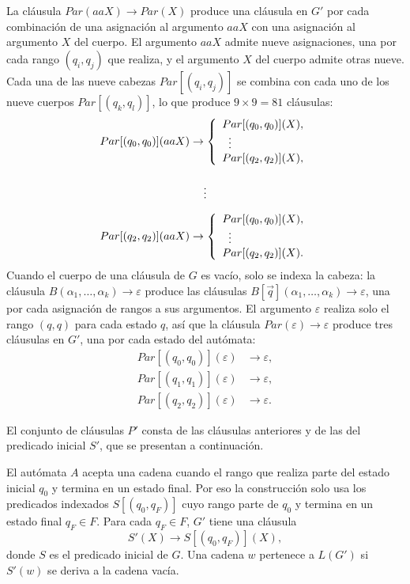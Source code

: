 \documentclass{report}
\theoremstyle{definition}
\theoremstyle{plain}
\theoremstyle{remark}
\begin{document}
La cláusula $Par(aaX) \to Par(X)$ produce una cláusula en $G'$ por
cada combinación de una asignación al argumento $aaX$ con una
asignación al argumento $X$ del cuerpo. El argumento $aaX$ admite
nueve asignaciones, una por cada rango $(q_i, q_j)$ que realiza, y el
argumento $X$ del cuerpo admite otras nueve. Cada una de las nueve
cabezas $Par[(q_i, q_j)]$ se combina con cada uno de los nueve cuerpos
$Par[(q_k, q_l)]$, lo que produce $9 \times 9 = 81$ cláusulas:
\[
\begin{array}{r@{\;\to\;}l}
Par[(q_0, q_0)](aaX) & \left\{
  \begin{array}{l}
    Par[(q_0, q_0)](X), \\
    \;\;\vdots \\
    Par[(q_2, q_2)](X),
  \end{array}\right. \\[3em]
\multicolumn{2}{c}{\vdots} \\[1em]
Par[(q_2, q_2)](aaX) & \left\{
  \begin{array}{l}
    Par[(q_0, q_0)](X), \\
    \;\;\vdots \\
    Par[(q_2, q_2)](X).
  \end{array}\right.
\end{array}
\]
Cuando el cuerpo de una cláusula de $G$ es vacío, solo se indexa la
cabeza: la cláusula $B(\alpha_1, \ldots, \alpha_k) \to \varepsilon$
produce las cláusulas $B[\vec q](\alpha_1, \ldots, \alpha_k) \to
\varepsilon$, una por cada asignación de rangos a sus argumentos. El
argumento $\varepsilon$ realiza solo el rango $(q, q)$ para cada estado
$q$, así que la cláusula $Par(\varepsilon) \to \varepsilon$ produce
tres cláusulas en $G'$, una por cada estado del autómata:
\begin{align*}
  Par[(q_0, q_0)](\varepsilon) &\to \varepsilon, \\
  Par[(q_1, q_1)](\varepsilon) &\to \varepsilon, \\
  Par[(q_2, q_2)](\varepsilon) &\to \varepsilon.
\end{align*}

El conjunto de cláusulas $P'$ consta de las cláusulas anteriores y de
las del predicado inicial $S'$, que se presentan a continuación.

El autómata $A$ acepta una cadena cuando el rango que realiza parte
del estado inicial $q_0$ y termina en un estado final. Por eso la
construcción solo usa los predicados indexados $S[(q_0, q_F)]$ cuyo
rango parte de $q_0$ y termina en un estado final $q_F \in F$. Para
cada $q_F \in F$, $G'$ tiene una cláusula
\[
  S'(X) \to S[(q_0, q_F)](X),
\]
donde $S$ es el predicado inicial de $G$. Una cadena $w$ pertenece a
$L(G')$ si $S'(w)$ se deriva a la cadena vacía.
\end{document}
